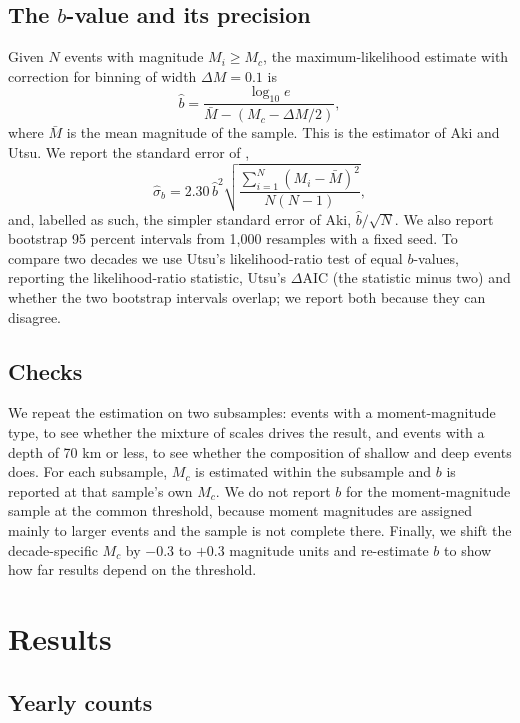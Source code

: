 \documentclass[11pt]{article}
\begin{document}
\subsection{The $b$-value and its precision}

Given $N$ events with magnitude $M_i \geq M_c$, the maximum-likelihood estimate with correction for binning of width $\Delta M = 0.1$ is
\begin{equation}
\hat b = \frac{\log_{10} e}{\bar M - (M_c - \Delta M/2)},
\label{eq:bvalue}
\end{equation}
where $\bar M$ is the mean magnitude of the sample. This is the estimator of Aki and Utsu. We report the standard error of \citet{shi1982the},
\begin{equation}
\hat\sigma_b = 2.30\,\hat b^{2}\sqrt{\frac{\sum_{i=1}^{N}(M_i-\bar M)^2}{N(N-1)}},
\label{eq:sebolt}
\end{equation}
and, labelled as such, the simpler standard error of Aki, $\hat b/\sqrt{N}$. We also report bootstrap 95 percent intervals from 1,000 resamples with a fixed seed.
To compare two decades we use Utsu's likelihood-ratio test of equal $b$-values, reporting the likelihood-ratio statistic, Utsu's $\Delta$AIC (the statistic minus two) and whether the two bootstrap intervals overlap; we report both because they can disagree.

\subsection{Checks}

We repeat the estimation on two subsamples: events with a moment-magnitude type, to see whether the mixture of scales drives the result, and events with a depth of 70 km or less, to see whether the composition of shallow and deep events does. For each subsample, $M_c$ is estimated within the subsample and $b$ is reported at that sample's own $M_c$. We do not report $b$ for the moment-magnitude sample at the common threshold, because moment magnitudes are assigned mainly to larger events and the sample is not complete there. Finally, we shift the decade-specific $M_c$ by $-0.3$ to $+0.3$ magnitude units and re-estimate $b$ to show how far results depend on the threshold.

\section{Results}

\subsection{Yearly counts}
\end{document}
